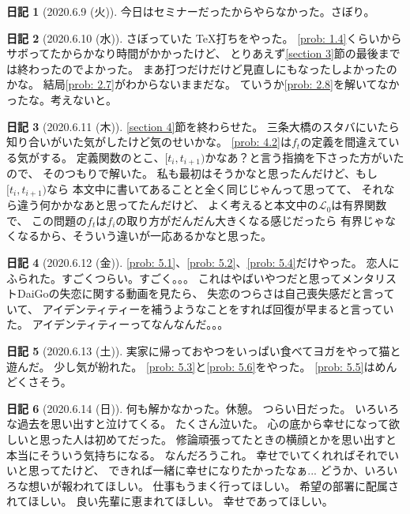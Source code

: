 \documentclass[uplatex]{jsarticle}
\theoremstyle{definition}
\newtheorem*{nikki*}{日記}
\def\mcL{\mathcal{L}}
\begin{document}
\begin{nikki*}[2020.6.9 (火)]
  今日はセミナーだったからやらなかった。さぼり。
\end{nikki*}

\begin{nikki*}[2020.6.10 (水)]
  さぼっていた \TeX 打ちをやった。
  \autoref{prob: 1.4}くらいからサボってたからかなり時間がかかったけど、
  とりあえず\ref{section 3}節の最後までは終わったのでよかった。
  まあ打つだけだけど見直しにもなったしよかったのかな。
  結局\autoref{prob: 2.7}がわからないままだな。
  ていうか\autoref{prob: 2.8}を解いてなかったな。考えないと。
\end{nikki*}

\begin{nikki*}[2020.6.11 (木)]
  \ref{section 4}節を終わらせた。
  三条大橋のスタバにいたら知り合いがいた気がしたけど気のせいかな。
  \autoref{prob: 4.2}は\(f_t\)の定義を間違えている気がする。
  定義関数のとこ、\([t_i,t_{i+1})\)かなあ？と言う指摘を下さった方がいたので、
  そのつもりで解いた。
  私も最初はそうかなと思ったんだけど、もし\([t_i,t_{i+1})\)なら
  本文中に書いてあることと全く同じじゃんって思ってて、
  それなら違う何かかなあと思ってたんだけど、
  よく考えると本文中の\(\mcL_0\)は有界関数で、
  この問題の\(f_t\)は\(f_i\)の取り方がだんだん大きくなる感じだったら
  有界じゃなくなるから、そういう違いが一応あるかなと思った。
\end{nikki*}

\begin{nikki*}[2020.6.12 (金)]
  \autoref{prob: 5.1}、\autoref{prob: 5.2}、\autoref{prob: 5.4}だけやった。
  恋人にふられた。すごくつらい。すごく。。。
  これはやばいやつだと思ってメンタリストDaiGoの失恋に関する動画を見たら、
  失恋のつらさは自己喪失感だと言っていて、
  アイデンティティーを補うようなことをすれば回復が早まると言っていた。
  アイデンティティーってなんなんだ。。。
\end{nikki*}

\begin{nikki*}[2020.6.13 (土)]
  実家に帰っておやつをいっぱい食べてヨガをやって猫と遊んだ。
  少し気が紛れた。
  \autoref{prob: 5.3}と\autoref{prob: 5.6}をやった。
  \autoref{prob: 5.5}はめんどくさそう。
\end{nikki*}

\begin{nikki*}[2020.6.14 (日)]
  何も解かなかった。休憩。
  つらい日だった。
  いろいろな過去を思い出すと泣けてくる。
  たくさん泣いた。
  心の底から幸せになって欲しいと思った人は初めてだった。
  修論頑張ってたときの横顔とかを思い出すと本当にそういう気持ちになる。
  なんだろうこれ。
  幸せでいてくれればそれでいいと思ってたけど、
  できれば一緒に幸せになりたかったなぁ...
  どうか、いろいろな想いが報われてほしい。
  仕事もうまく行ってほしい。
  希望の部署に配属されてほしい。
  良い先輩に恵まれてほしい。
  幸せであってほしい。
\end{nikki*}
\end{document}
